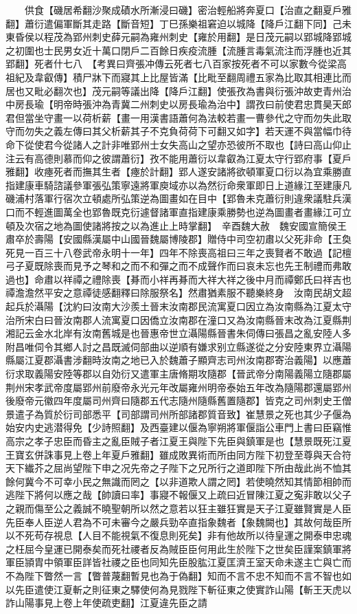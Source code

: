 　　供食【磯居希翻沙聚成磧水所漸浸曰磯】密治輕船將奔夏口【治直之翻夏戶雅翻】蕭衍遣偏軍斷其走路【斷音短】丁巳孫樂祖窘迫以城降【降戶江翻下同】己未東昏侯以程茂為郢州刺史薛元嗣為雍州刺史【雍於用翻】是日茂元嗣以郢城降郢城之初圍也士民男女近十萬口閉戶二百餘日疾疫流腫【流腫言毒氣流注而浮腫也近其郢翻】死者什七八　【考異曰齊張冲傳云死者七八百家按死者不可以家數今從梁高祖紀及韋叡傳】積尸牀下而寢其上比屋皆滿【比毗至翻周禮五家為比取其相連比而居也又毗必翻次也】茂元嗣等議出降【降戶江翻】使張孜為書與衍張沖故吏青州治中房長瑜【明帝時張沖為青冀二州刺史以房長瑜為治中】謂孜曰前使君忠貫昊天郎君但當坐守畫一以荷析薪【畫一用漢書語蕭何為法較若畫一曹參代之守而勿失此取守而勿失之義左傳曰其父析薪其子不克負荷荷下可翻又如字】若天運不與當幅巾待命下從使君今從諸人之計非唯郢州士女失高山之望亦恐彼所不取也【詩曰高山仰止注云有高德則慕而仰之彼謂蕭衍】孜不能用蕭衍以韋叡為江夏太守行郢府事【夏戶雅翻】收瘞死者而撫其生者【瘞於計翻】郢人遂安諸將欲頓軍夏口衍以為宜乘勝直指建康車騎諮議參軍張弘策寧遠將軍庾域亦以為然衍命衆軍即日上道緣江至建康凡磯浦村落軍行宿次立頓處所弘策逆為圖畫如在目中【郢魯未克蕭衍則違衆議駐兵漢口而不輕進圖萬全也郢魯既克衍遽督諸軍直指建康乘勝勢也逆為圖畫者畫緣江可立頓及次宿之地為圖使諸將按之以為進止上時掌翻】　辛酉魏大赦　魏安國宣簡侯王肅卒於壽陽【安國縣漢屬中山國晉魏屬博陵郡】贈侍中司空初肅以父死非命【王奐死見一百三十八卷武帝永明十一年】四年不除喪高祖曰三年之喪賢者不敢過【記檀弓子夏既除喪而見予之琴和之而不和彈之而不成聲作而曰哀未忘也先王制禮而弗敢過也】命肅以祥禫之禮除喪【朞而小祥再朞而大祥大祥之後中月而禫鄭氏曰祥吉也禫澹澹然平安之意禫徒感翻釋曰除服祭名】然肅猶素服不聽樂終身　汝南民胡文超起兵於灄陽【沈約曰汝南大沙羨土晉末汝南郡民流寓夏口因立為汝南縣為江夏太守治所宋白曰晉汝南郡人流寓夏口因僑立汝南郡在潼口又為汝南縣晉末改為江夏縣荆湘記云金水北岸有汝南舊城是也晉惠帝世立灄陽縣晉書朱伺傳曰張昌之亂安陸人多附昌唯伺令其鄉人討之昌既滅伺部曲以逆順有嫌求别立縣遂從之分安陸東界立灄陽縣屬江夏郡灄書涉翻時汝南之地已入於魏蕭子顯齊志司州汝南郡寄治義陽】以應蕭衍求取義陽安陸等郡以自効衍又遣軍主唐脩期攻隨郡【晉武帝分南陽義陽立隨郡屬荆州宋孝武帝度屬郢州前廢帝永光元年改屬雍州明帝泰始五年改為隨陽郡還屬郢州後廢帝元徽四年度屬司州齊曰隨郡五代志隨州隨縣舊置隨郡】皆克之司州刺史王僧景遣子為質於衍司部悉平【司部謂司州所部諸郡質音致】崔慧景之死也其少子偃為始安内史逃潜得免【少詩照翻】及西臺建以偃為寧朔將軍偃詣公車門上書曰臣竊惟高宗之孝子忠臣而昏主之亂臣賊子者江夏王與陛下先臣與鎮軍是也【慧景既死江夏王寶玄併誅事見上卷上年夏戶雅翻】雖成敗異術而所由同方陛下初登至尊與天合符天下纎芥之屈尚望陛下申之况先帝之子陛下之兄所行之道即陛下所由哉此尚不恤其餘何冀今不可幸小民之無識而罔之【以非道欺人謂之罔】若使曉然知其情節相帥而逃陛下將何以應之哉【帥讀曰率】事寢不報偃又上疏曰近冒陳江夏之寃非敢以父子之親而傷至公之義誠不曉聖朝所以然之意若以狂主雖狂實是天子江夏雖賢實是人臣先臣奉人臣逆人君為不可未審今之嚴兵勁卒直指象魏者【象魏闕也】其故何哉臣所以不死苟存視息【人目不能視氣不復息則死矣】非有他故所以待皇運之開泰申忠魂之枉屈今皇運已開泰矣而死社禝者反為賊臣臣何用此生於陛下之世矣臣謹案鎮軍將軍臣頴胄中領軍臣詳皆社禝之臣也同知先臣股肱江夏匡濟王室天命未遂主亡與亡而不為陛下瞥然一言【瞥普蔑翻暫見也為于偽翻】知而不言不忠不知而不言不智也如以先臣遣使江夏斬之則征東之驛使何為見戮陛下斬征東之使實詐山陽【斬王天虎以詐山陽事見上卷上年使疏吏翻】江夏違先臣之請
